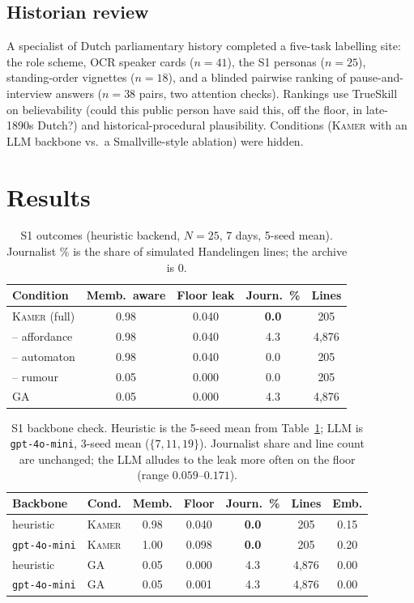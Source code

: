 \documentclass[sigconf,review,anonymous]{acmart}
\newcommand{\sys}{\textsc{Kamer}}
\begin{document}
\subsection{Historian review}
\label{sec:eval-interview}
A specialist of Dutch parliamentary history completed a five-task labelling
site: the role scheme, OCR speaker cards ($n{=}41$), the S1 personas
($n{=}25$), standing-order vignettes ($n{=}18$), and a blinded pairwise
ranking of pause-and-interview answers ($n{=}38$ pairs, two attention
checks). Rankings use TrueSkill~\cite{herbrich2006trueskill} on
believability (could this public person have said this, off the floor, in
late-1890s Dutch?) and historical-procedural plausibility. Conditions
(\sys{} with an LLM backbone vs.\ a Smallville-style ablation) were hidden.

\section{Results}
\label{sec:results}

\begin{table}[t]
\caption{S1 outcomes (heuristic backend, $N{=}25$, 7 days, 5-seed mean).
Journalist \% is the share of simulated Handelingen lines; the archive is
$0$.}
\label{tab:interview}
\centering\small
\setlength{\tabcolsep}{3.5pt}
\begin{tabular}{lcccc}
\toprule
Condition & Memb.\ aware & Floor leak & Journ.\ \% & Lines \\
\midrule
\sys{} (full) & 0.98 & 0.040 & \textbf{0.0} & 205 \\
\quad -- affordance & 0.98 & 0.040 & 4.3 & 4{,}876 \\
\quad -- automaton & 0.98 & 0.040 & 0.0 & 205 \\
\quad -- rumour & 0.05 & 0.000 & 0.0 & 205 \\
GA~\cite{park2023generative} & 0.05 & 0.000 & 4.3 & 4{,}876 \\
\bottomrule
\end{tabular}
\end{table}

\begin{table}[t]
\caption{S1 backbone check. Heuristic is the 5-seed mean from
Table~\ref{tab:interview}; LLM is \texttt{gpt-4o-mini}, 3-seed mean
($\{7,11,19\}$). Journalist share and line count are unchanged; the LLM
alludes to the leak more often on the floor (range $0.059$--$0.171$).}
\label{tab:backbone}
\centering\small
\setlength{\tabcolsep}{3.2pt}
\begin{tabular}{llccccc}
\toprule
Backbone & Cond. & Memb. & Floor & Journ.\ \% & Lines & Emb. \\
\midrule
heuristic & \sys{} & 0.98 & 0.040 & \textbf{0.0} & 205 & 0.15 \\
\texttt{gpt-4o-mini} & \sys{} & 1.00 & 0.098 & \textbf{0.0} & 205 & 0.20 \\
heuristic & GA & 0.05 & 0.000 & 4.3 & 4{,}876 & 0.00 \\
\texttt{gpt-4o-mini} & GA & 0.05 & 0.001 & 4.3 & 4{,}876 & 0.00 \\
\bottomrule
\end{tabular}
\end{table}
\end{document}
